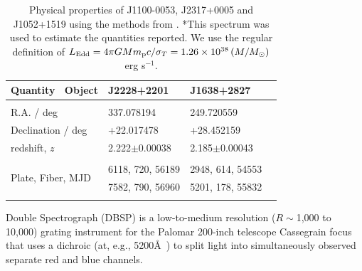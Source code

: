 \documentclass[a4paper,fleqn,usenatbib]{mnras}
\begin{document}
\begin{table}
 \centering
 \begin{tabular}{l l l l}
  \hline \hline 
   Quantity \ Object                           & J2228+2201     &  J1638+2827 \\
 \hline 
    &&\\
    R.A. / deg                                        &    337.078194      &  249.720559\\
    Declination / deg                            &    +22.017478      &  +28.452159 \\
    redshift, $z$                                    &   2.222$\pm$0.00038   &  2.185$\pm$0.00043          \\
    &&\\ 
    \multirow{2}{*}{Plate, Fiber, MJD}   & 6118, 720, 56189	     &  2948, 614, 54553	  \\
                                         & 7582, 790, 56960	     & 5201, 178, 55832 \\    
    &&\\
    \hline \hline 
  \end{tabular}
  \caption{Physical properties of J1100-0053, J2317+0005 and J1052+1519 using the
    methods from \citet{Shen2011}. *This spectrum was used to estimate
    the quantities reported.  We use the regular definition of $L_{\rm
      Edd} = 4 \pi G M m_{\rm p} c /\sigma_{T} =
    1.26\times10^{38}\left (M/M_{\odot} \right )$ erg s$^{-1}$.} 
 \label{tab:Shen_props}
\end{table}

Double Spectrograph (DBSP) is a low-to-medium resolution ($R\sim$1,000
to 10,000) grating instrument for the Palomar 200-inch telescope
Cassegrain focus that uses a dichroic (at, e.g., 5200\AA\ ) to split
light into simultaneously observed separate red and blue channels. 
\end{document}
